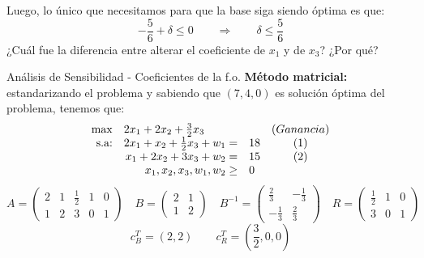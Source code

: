 \documentclass[10pt, aspectratio=169]{beamer}
\begin{document}
\begin{frame}{}
    Luego, lo único que necesitamos para que la base siga siendo óptima es que:
    \[ -\frac{5}{6}+\delta \leq 0 \qquad \Rightarrow \qquad \delta \leq \frac{5}{6} \]
    \pause
    \vskip 1cm
    ¿Cuál fue la diferencia entre alterar el coeficiente de $x_1$ y de $x_3$? ¿Por qué?
\end{frame}

\begin{frame}{Análisis de Sensibilidad - Coeficientes de la f.o.} \small
    \textbf{Método matricial:} estandarizando el problema y sabiendo que $(7,4,0)$ es solución óptima del problema, tenemos que:
    $$
    \begin{array}{rrlc}
    \max & \multicolumn{2}{l}{2x_1+2x_2+\frac{3}{2}x_3} & (Ganancia)\\
    \text{s.a:}& 2x_1+x_2+\frac{1}{2}x_3 + w_1 = & 18 & (1)\\
     & x_1+2x_2+3x_3 + w_2 = & 15 & (2)\\
     & x_1, x_2, x_3, w_1, w_2\geq & 0 \\
    \end{array}
    $$
    \[A=
    \left(\begin{matrix} 
    2 & 1 & \frac{1}{2} & 1 & 0 \\
    1 & 2 & 3 & 0 & 1
    \end{matrix}\right)
    \quad 
    B=\left(
    \begin{matrix}
    2 & 1 \\
    1 & 2
    \end{matrix}
    \right)
    \quad
    B^{-1}=\left(
    \begin{matrix}
    \frac{2}{3} & -\frac{1}{3} \\
    -\frac{1}{3} & \frac{2}{3}
    \end{matrix}
    \right)
    \quad
    R=\left(
    \begin{matrix}
    \frac{1}{2} & 1 & 0 \\
    3 & 0 & 1
    \end{matrix}
    \right)
    \]
    \[ c_B^T=(2,2) \qquad c_R^T=(\frac{3}{2},0,0)
    \]
\end{frame}
\end{document}
